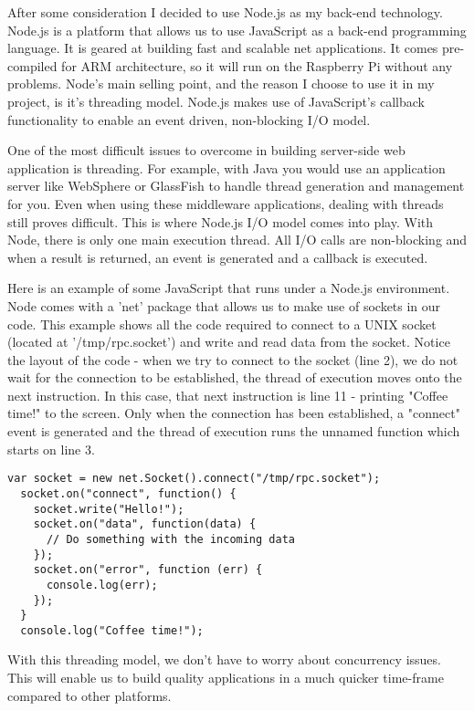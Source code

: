 After some consideration I decided to use Node.js\cite{Node} as my back-end technology. Node.js is a platform that allows us to use JavaScript as a back-end programming language. It is geared at building fast and scalable net applications. It comes pre-compiled for ARM architecture, so it will run on the Raspberry Pi without any problems. Node's main selling point, and the reason I choose to use it in my project, is it's threading model. Node.js makes use of JavaScript's callback functionality to enable an event driven, non-blocking I/O model. 

One of the most difficult issues to overcome in building server-side web application is threading. For example, with Java you would use an application server like WebSphere\cite{WebSphere} or GlassFish\cite{GlassFish} to handle thread generation and management for you. Even when using these middleware applications, dealing with threads still proves difficult. This is where Node.js I/O model comes into play. With Node, there is only one main execution thread. All I/O calls are non-blocking and when a result is returned, an event is generated and a callback is executed.

Here is an example of some JavaScript that runs under a Node.js environment. Node comes with a 'net' package that allows us to make use of sockets in our code. This example shows all the code required to connect to a UNIX socket (located at '/tmp/rpc.socket') and write and read data from the socket. Notice the layout of the code - when we try to connect to the socket (line 2), we do not wait for the connection to be established, the thread of execution moves onto the next instruction. In this case, that next instruction is line 11 - printing "Coffee time!" to the screen. Only when the connection has been established, a "connect" event is generated and the thread of execution runs the unnamed function which starts on line 3. 

\vspace{20px}
\begin{lstlisting}[caption=Node.js and event driven I/O]
  var socket = new net.Socket().connect("/tmp/rpc.socket");
  socket.on("connect", function() {
    socket.write("Hello!");  
    socket.on("data", function(data) {
      // Do something with the incoming data
    });  
    socket.on("error", function (err) {
      console.log(err);
    });
  }
  console.log("Coffee time!");
\end{lstlisting}


With this threading model, we don't have to worry about concurrency issues. This will enable us to build quality applications in a much quicker time-frame compared to other platforms.

